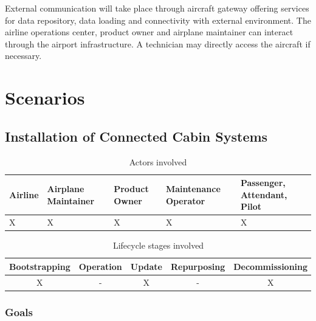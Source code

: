 External communication will take place through aircraft gateway offering services for data repository, data loading and
connectivity with external environment. The airline operations center, product owner and airplane maintainer can interact
through the airport infrastructure. A technician may directly access the aircraft if necessary.



\section{Scenarios} %
\label{sec:Scenarios}

\subsection{Installation of Connected Cabin Systems} %
\label{sub:Installation of Connected Cabin Systems}

\begin{table}
	\caption{Actors involved}
	\label{tab:Actors involved installation}
	\begin{center}
		\begin{tabular}{ |p{2.5cm}|p{2.5cm}|p{2.5cm}|p{2.5cm}|p{2.5cm}| }
			\hline
			Airline & Airplane Maintainer & Product Owner & Maintenance Operator & Passenger, Attendant, Pilot \\
			\hline
			X       & X                   & X             & X                    & X                           \\
			\hline
		\end{tabular}
	\end{center}
\end{table}

\begin{table}
	\caption{Lifecycle stages involved}
	\label{tab:Lifecycle stages involved installation}
	\begin{center}
		\begin{tabular}{ |c|c|c|c|c| }
			\hline
			Bootstrapping & Operation & Update & Repurposing & Decommissioning \\
			\hline
			X             & -         & X      & -           & X               \\
			\hline
		\end{tabular}
	\end{center}
\end{table}


\subsubsection{Goals}

